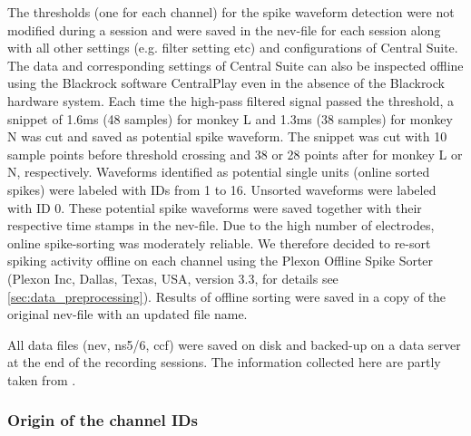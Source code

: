 {The thresholds (one for each channel) for the spike waveform detection were not modified during a session and were saved in the nev-file for each session along with all other settings (e.g. filter setting etc) and configurations of Central Suite. The data and corresponding settings of Central Suite can also be inspected offline using the Blackrock software CentralPlay even in the absence of the Blackrock hardware system. Each time the high-pass filtered signal passed the threshold, a snippet of 1.6ms (48 samples) for monkey L and 1.3ms (38 samples) for monkey N was cut and saved as potential spike waveform. The snippet was cut with 10 sample points before threshold crossing and 38 or 28 points after for monkey L or N, respectively. Waveforms identified as potential single units (online sorted spikes) were labeled with IDs from 1 to 16. Unsorted waveforms were labeled with ID 0. These potential spike waveforms were saved together with their respective time stamps in the nev-file. Due to the high number of electrodes, online spike-sorting was moderately reliable. We therefore decided to re-sort spiking activity offline on each channel using the Plexon Offline Spike Sorter (Plexon Inc, Dallas, Texas, USA, version 3.3, for details see \cref{sec:data_preprocessing}). Results of offline sorting were saved in a copy of the original nev-file with an updated file name. 

All data files (nev, ns5/6, ccf) were saved on disk and backed-up on a data server at the end of the recording sessions. The information collected here are partly taken from \citep{Riehle_2013, Zehl_2016}.


\subsubsection{Origin of the channel IDs}
\label{sec:channel_ids}

}
